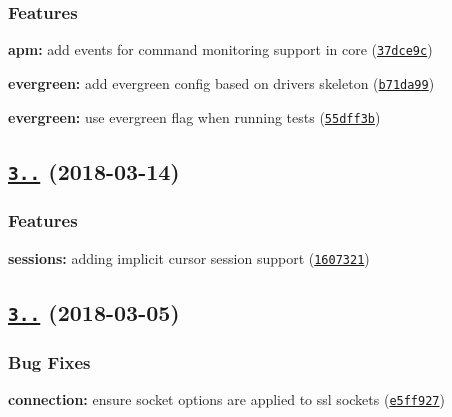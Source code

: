 \subsubsection*{Features}


\begin{DoxyItemize}
\item {\bfseries apm\+:} add events for command monitoring support in core (\href{https://github.com/mongodb-js/mongodb-core/commit/37dce9c}{\tt 37dce9c})
\item {\bfseries evergreen\+:} add evergreen config based on drivers skeleton (\href{https://github.com/mongodb-js/mongodb-core/commit/b71da99}{\tt b71da99})
\item {\bfseries evergreen\+:} use evergreen flag when running tests (\href{https://github.com/mongodb-js/mongodb-core/commit/55dff3b}{\tt 55dff3b})
\end{DoxyItemize}

\label{_3.0.5}%
 \subsection*{\href{https://github.com/mongodb-js/mongodb-core/compare/v3.0.4...v3.0.5}{\tt 3..} (2018-\/03-\/14)}

\subsubsection*{Features}


\begin{DoxyItemize}
\item {\bfseries sessions\+:} adding implicit cursor session support (\href{https://github.com/mongodb-js/mongodb-core/commit/1607321}{\tt 1607321})
\end{DoxyItemize}

\label{_3.0.4}%
 \subsection*{\href{https://github.com/mongodb-js/mongodb-core/compare/v3.0.3...v3.0.4}{\tt 3..} (2018-\/03-\/05)}

\subsubsection*{Bug Fixes}


\begin{DoxyItemize}
\item {\bfseries connection\+:} ensure socket options are applied to ssl sockets (\href{https://github.com/mongodb-js/mongodb-core/commit/e5ff927}{\tt e5ff927})
\end{DoxyItemize}

